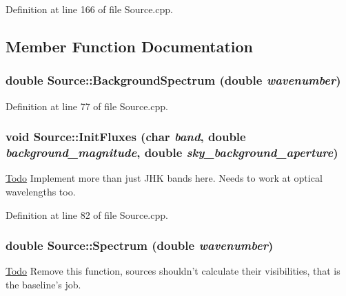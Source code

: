 Definition at line 166 of file Source.cpp.



\subsection{Member Function Documentation}
\hypertarget{classSource_a29c1541293674ddb2b9e7aa4cb130306}{
\subsubsection[{BackgroundSpectrum}]{\setlength{\rightskip}{0pt plus 5cm}double Source::BackgroundSpectrum (double {\em wavenumber})}}
\label{classSource_a29c1541293674ddb2b9e7aa4cb130306}


Definition at line 77 of file Source.cpp.

\hypertarget{classSource_a6ddbe3353cd4d57bcad7010c70a1b06c}{
\subsubsection[{InitFluxes}]{\setlength{\rightskip}{0pt plus 5cm}void Source::InitFluxes (char {\em band}, \/  double {\em background\_\-magnitude}, \/  double {\em sky\_\-background\_\-aperture})}}
\label{classSource_a6ddbe3353cd4d57bcad7010c70a1b06c}


\begin{Desc}
\item[\hyperlink{todo__todo000012}{Todo}]Implement more than just JHK bands here. Needs to work at optical wavelengths too. \end{Desc}




Definition at line 82 of file Source.cpp.

\hypertarget{classSource_a1b9f408aa6c5dcd5550e9cb28922e3af}{
\subsubsection[{Spectrum}]{\setlength{\rightskip}{0pt plus 5cm}double Source::Spectrum (double {\em wavenumber})}}
\label{classSource_a1b9f408aa6c5dcd5550e9cb28922e3af}
\begin{Desc}
\item[\hyperlink{todo__todo000013}{Todo}]Remove this function, sources shouldn't calculate their visibilities, that is the baseline's job. \end{Desc}



